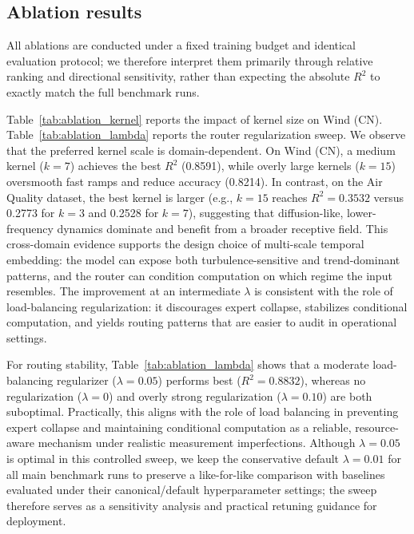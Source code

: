 \documentclass[review,3p,times]{elsarticle}
\begin{document}
\subsection{Ablation results}
\label{subsec:results_ablation}
All ablations are conducted under a fixed training budget and identical evaluation protocol; we therefore interpret them primarily through relative ranking and directional sensitivity, rather than expecting the absolute $R^2$ to exactly match the full benchmark runs.

Table~\ref{tab:ablation_kernel} reports the impact of kernel size on Wind (CN). Table~\ref{tab:ablation_lambda} reports the router regularization sweep. We observe that the preferred kernel scale is domain-dependent. On Wind (CN), a medium kernel ($k=7$) achieves the best $R^2$ (0.8591), while overly large kernels ($k=15$) oversmooth fast ramps and reduce accuracy (0.8214). In contrast, on the Air Quality dataset, the best kernel is larger (e.g., $k=15$ reaches $R^2=0.3532$ versus 0.2773 for $k=3$ and 0.2528 for $k=7$), suggesting that diffusion-like, lower-frequency dynamics dominate and benefit from a broader receptive field. This cross-domain evidence supports the design choice of multi-scale temporal embedding: the model can expose both turbulence-sensitive and trend-dominant patterns, and the router can condition computation on which regime the input resembles. The improvement at an intermediate $\lambda$ is consistent with the role of load-balancing regularization: it discourages expert collapse, stabilizes conditional computation, and yields routing patterns that are easier to audit in operational settings.

For routing stability, Table~\ref{tab:ablation_lambda} shows that a moderate load-balancing regularizer ($\lambda=0.05$) performs best ($R^2=0.8832$), whereas no regularization ($\lambda=0$) and overly strong regularization ($\lambda=0.10$) are both suboptimal. Practically, this aligns with the role of load balancing in preventing expert collapse and maintaining conditional computation as a reliable, resource-aware mechanism under realistic measurement imperfections. Although $\lambda=0.05$ is optimal in this controlled sweep, we keep the conservative default $\lambda=0.01$ for all main benchmark runs to preserve a like-for-like comparison with baselines evaluated under their canonical/default hyperparameter settings; the sweep therefore serves as a sensitivity analysis and practical retuning guidance for deployment.
\end{document}
